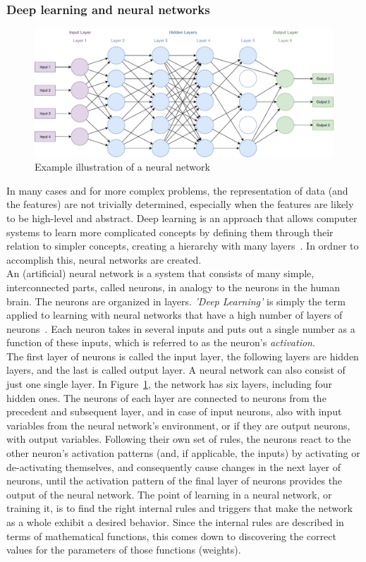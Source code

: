 \documentclass[
a4paper,
pagesize,
pdftex,
12pt,
twoside, %
BCOR=5mm, %
ngerman,
fleqn,
final,
]{scrartcl}
\begin{document}
	\subsubsection{Deep learning and neural networks}\label{Deep-Learning}
	\begin{figure}[ht]
		\centering
		\includegraphics[width=\linewidth]{img/NeuralNetwork}
		\caption{Example illustration of a neural network}
		\label{fig:neuralnetwork}
	\end{figure}
	In many cases and for more complex problems, the representation of data (and the features) are not trivially determined, especially when the features are likely to be high-level and abstract. Deep learning is an approach that allows computer systems to learn more complicated concepts by defining them through their relation to simpler concepts, creating a hierarchy with many layers~\cite{Goodfellow.2016}.	In ordner to accomplish this, neural networks are created.\\
	An (artificial) neural network is a system that consists of many simple, interconnected parts, called neurons, in analogy to the neurons in the human brain. The neurons are organized in layers. \textit{'Deep Learning'} is simply the term applied to learning with neural networks that have a high number of layers of neurons~\cite{Nielsen.2015}. Each neuron takes in several inputs and puts out a single number as a function of these inputs, which is referred to as the neuron's \textit{activation}.\\
	The first layer of neurons is called the input layer, the following layers are hidden layers, and the last is called output layer. A neural network can also consist of just one single layer. In Figure~\ref{fig:neuralnetwork}, the network has six layers, including four hidden ones. The neurons of each layer are connected to neurons from the precedent and subsequent layer, and in case of input neurons, also with input variables from the neural network's environment, or if they are output neurons, with output variables. Following their own set of rules, the neurons react to the other neuron's activation patterns (and, if applicable, the inputs) by activating or de-activating themselves, and consequently cause changes in the next layer of neurons, until the activation pattern of the final layer of neurons provides the output of the neural network. The point of learning in a neural network, or training it, is to find the right internal rules and triggers that make the network as a whole exhibit a desired behavior. Since the internal rules are described in terms of mathematical functions, this comes down to discovering the correct values for the parameters of those functions (weights).\\
\end{document}

